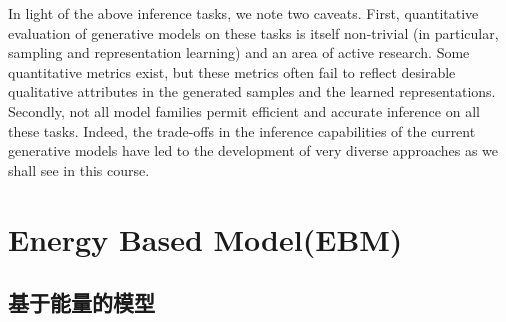 In light of the above inference tasks, we note two caveats. First,
quantitative evaluation of generative models on these tasks is itself
non-trivial (in particular, sampling and representation learning) and an
area of active research. Some quantitative metrics exist, but these
metrics often fail to reflect desirable qualitative attributes in the
generated samples and the learned representations. Secondly, not all
model families permit efficient and accurate inference on all these
tasks. Indeed, the trade-offs in the inference capabilities of the
current generative models have led to the development of very diverse approaches as
we shall see in this course.


\section{Energy Based Model(EBM)}


\subsection{基于能量的模型}

